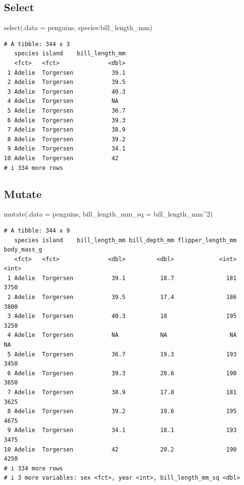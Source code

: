 \documentclass[
  letterpaper,
  DIV=11,
  numbers=noendperiod,
  oneside]{scrreprt}
\newenvironment{Shaded}{\begin{snugshade}}{\end{snugshade}}
\newcommand{\AttributeTok}[1]{\textcolor[rgb]{0.40,0.45,0.13}{#1}}
\newcommand{\DecValTok}[1]{\textcolor[rgb]{0.68,0.00,0.00}{#1}}
\newcommand{\FunctionTok}[1]{\textcolor[rgb]{0.28,0.35,0.67}{#1}}
\newcommand{\NormalTok}[1]{\textcolor[rgb]{0.00,0.23,0.31}{#1}}
\newcommand{\SpecialCharTok}[1]{\textcolor[rgb]{0.37,0.37,0.37}{#1}}
\begin{document}
\subsection{Select}

\begin{Shaded}
\begin{Highlighting}[]
\FunctionTok{select}\NormalTok{(}\AttributeTok{.data =}\NormalTok{ penguins, species}\SpecialCharTok{:}\NormalTok{bill\_length\_mm)}
\end{Highlighting}
\end{Shaded}

\begin{verbatim}
# A tibble: 344 x 3
   species island    bill_length_mm
   <fct>   <fct>              <dbl>
 1 Adelie  Torgersen           39.1
 2 Adelie  Torgersen           39.5
 3 Adelie  Torgersen           40.3
 4 Adelie  Torgersen           NA  
 5 Adelie  Torgersen           36.7
 6 Adelie  Torgersen           39.3
 7 Adelie  Torgersen           38.9
 8 Adelie  Torgersen           39.2
 9 Adelie  Torgersen           34.1
10 Adelie  Torgersen           42  
# i 334 more rows
\end{verbatim}

\subsection{Mutate}

\begin{Shaded}
\begin{Highlighting}[]
\FunctionTok{mutate}\NormalTok{(}\AttributeTok{.data =}\NormalTok{ penguins, }\AttributeTok{bill\_length\_mm\_sq =}\NormalTok{ bill\_length\_mm}\SpecialCharTok{\^{}}\DecValTok{2}\NormalTok{)}
\end{Highlighting}
\end{Shaded}

\begin{verbatim}
# A tibble: 344 x 9
   species island    bill_length_mm bill_depth_mm flipper_length_mm body_mass_g
   <fct>   <fct>              <dbl>         <dbl>             <int>       <int>
 1 Adelie  Torgersen           39.1          18.7               181        3750
 2 Adelie  Torgersen           39.5          17.4               186        3800
 3 Adelie  Torgersen           40.3          18                 195        3250
 4 Adelie  Torgersen           NA            NA                  NA          NA
 5 Adelie  Torgersen           36.7          19.3               193        3450
 6 Adelie  Torgersen           39.3          20.6               190        3650
 7 Adelie  Torgersen           38.9          17.8               181        3625
 8 Adelie  Torgersen           39.2          19.6               195        4675
 9 Adelie  Torgersen           34.1          18.1               193        3475
10 Adelie  Torgersen           42            20.2               190        4250
# i 334 more rows
# i 3 more variables: sex <fct>, year <int>, bill_length_mm_sq <dbl>
\end{verbatim}
\end{document}
